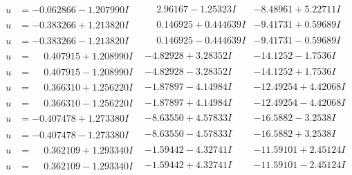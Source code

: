 \documentclass[1p]{elsarticle_modified}
\theoremstyle{definition}
\begin{document}
$$\begin{array}{c|c|c}
\begin{aligned}
u &= -0.062866 - 1.207990 I\end{aligned}
 & \phantom{-}2.96167 - 1.25323 I & -8.48961 + 5.22711 I \\ \hline\begin{aligned}
u &= -0.383266 + 1.213820 I\end{aligned}
 & \phantom{-}0.146925 + 0.444639 I & -9.41731 + 0.59689 I \\ \hline\begin{aligned}
u &= -0.383266 - 1.213820 I\end{aligned}
 & \phantom{-}0.146925 - 0.444639 I & -9.41731 - 0.59689 I \\ \hline\begin{aligned}
u &= \phantom{-}0.407915 + 1.208990 I\end{aligned}
 & -4.82928 + 3.28352 I & -14.1252 - 1.7536 I \\ \hline\begin{aligned}
u &= \phantom{-}0.407915 - 1.208990 I\end{aligned}
 & -4.82928 - 3.28352 I & -14.1252 + 1.7536 I \\ \hline\begin{aligned}
u &= \phantom{-}0.366310 + 1.256220 I\end{aligned}
 & -1.87897 - 4.14984 I & -12.49254 + 4.42068 I \\ \hline\begin{aligned}
u &= \phantom{-}0.366310 - 1.256220 I\end{aligned}
 & -1.87897 + 4.14984 I & -12.49254 - 4.42068 I \\ \hline\begin{aligned}
u &= -0.407478 + 1.273380 I\end{aligned}
 & -8.63550 + 4.57833 I & -16.5882 - 3.2538 I \\ \hline\begin{aligned}
u &= -0.407478 - 1.273380 I\end{aligned}
 & -8.63550 - 4.57833 I & -16.5882 + 3.2538 I \\ \hline\begin{aligned}
u &= \phantom{-}0.362109 + 1.293340 I\end{aligned}
 & -1.59442 - 4.32741 I & -11.59101 + 2.45124 I \\ \hline\begin{aligned}
u &= \phantom{-}0.362109 - 1.293340 I\end{aligned}
 & -1.59442 + 4.32741 I & -11.59101 - 2.45124 I \\ \hline\begin{aligned}

\end{aligned}
\end{array}$$
\end{document}
